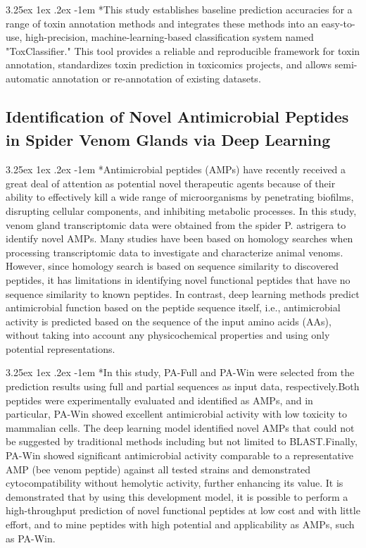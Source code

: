 \documentclass{article}
\makeatletter
\renewcommand\paragraph{\@startsection{paragraph}{4}{\z@}%
	{3.25ex \@plus1ex \@minus.2ex}%
	{-1em}%
	{\normalfont\normalsize}}
\makeatother
\begin{document}
		\paragraph*{This study establishes baseline prediction accuracies for a range of toxin annotation methods and integrates these methods into an easy-to-use, high-precision, machine-learning-based classification system named "ToxClassifier." This tool provides a reliable and reproducible framework for toxin annotation, standardizes toxin prediction in toxicomics projects, and allows semi-automatic annotation or re-annotation of existing datasets.}
		
		\subsection*{Identification of Novel Antimicrobial Peptides in Spider Venom Glands via Deep Learning\textsuperscript{\cite{ref7}}}
		
		\paragraph*{Antimicrobial peptides (AMPs) have recently received a great deal of attention as potential novel therapeutic agents because of their ability to effectively kill a wide range of microorganisms by penetrating biofilms, disrupting cellular components, and inhibiting metabolic processes. In this study, venom gland transcriptomic data were obtained from the spider P. astrigera to identify novel AMPs. Many studies have been based on homology searches when processing transcriptomic data to investigate and characterize animal venoms. However, since homology search is based on sequence similarity to discovered peptides, it has limitations in identifying novel functional peptides that have no sequence similarity to known peptides. In contrast, deep learning methods predict antimicrobial function based on the peptide sequence itself, i.e., antimicrobial activity is predicted based on the sequence of the input amino acids (AAs), without taking into account any physicochemical properties and using only potential representations.}
		
		\paragraph*{In this study, PA-Full and PA-Win were selected from the prediction results using full and partial sequences as input data, respectively.Both peptides were experimentally evaluated and identified as AMPs, and in particular, PA-Win showed excellent antimicrobial activity with low toxicity to mammalian cells. The deep learning model identified novel AMPs that could not be suggested by traditional methods including but not limited to BLAST.Finally, PA-Win showed significant antimicrobial activity comparable to a representative AMP (bee venom peptide) against all tested strains and demonstrated cytocompatibility without hemolytic activity, further enhancing its value. It is demonstrated that by using this development model, it is possible to perform a high-throughput prediction of novel functional peptides at low cost and with little effort, and to mine peptides with high potential and applicability as AMPs, such as PA-Win.}
		
\end{document}
